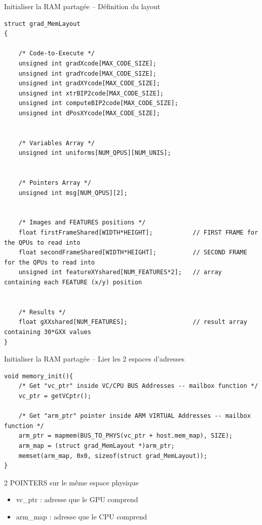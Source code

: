 \documentclass{bredelebeamer}
\begin{document}
\begin{frame}[fragile]{Initialiser la RAM partagée -- Définition du layout}

\begin{lstlisting}
struct grad_MemLayout
{

    /* Code-to-Execute */
    unsigned int gradXcode[MAX_CODE_SIZE];
    unsigned int gradYcode[MAX_CODE_SIZE];
    unsigned int gradXYcode[MAX_CODE_SIZE];
    unsigned int xtrBIP2code[MAX_CODE_SIZE];
    unsigned int computeBIP2code[MAX_CODE_SIZE];
    unsigned int dPosXYcode[MAX_CODE_SIZE];


    /* Variables Array */
    unsigned int uniforms[NUM_QPUS][NUM_UNIS];


    /* Pointers Array */
    unsigned int msg[NUM_QPUS][2];


    /* Images and FEATURES positions */
    float firstFrameShared[WIDTH*HEIGHT];           // FIRST FRAME for the QPUs to read into
    float secondFrameShared[WIDTH*HEIGHT];          // SECOND FRAME for the QPUs to read into
    unsigned int featureXYshared[NUM_FEATURES*2];   // array containing each FEATURE (x/y) position


    /* Results */
    float gXXshared[NUM_FEATURES];                  // result array containing 30*GXX values
}
\end{lstlisting}

\end{frame}


\begin{frame}[fragile]{Initialiser la RAM partagée -- Lier les 2 espaces d'adresses}

\begin{lstlisting}
void memory_init(){
    /* Get "vc_ptr" inside VC/CPU BUS Addresses -- mailbox function */
    vc_ptr = getVCptr();

    /* Get "arm_ptr" pointer inside ARM VIRTUAL Addresses -- mailbox function */
    arm_ptr = mapmem(BUS_TO_PHYS(vc_ptr + host.mem_map), SIZE);
    arm_map = (struct grad_MemLayout *)arm_ptr;
    memset(arm_map, 0x0, sizeof(struct grad_MemLayout));
}
\end{lstlisting}

\begin{alertblock}{2 POINTERS sur le m\^eme espace physique}
\begin{itemize}
\item vc\_ptr : adresse que le GPU comprend
\item arm\_map : adresse que le CPU comprend
\end{itemize}
\end{alertblock}

\end{frame}
\end{document}
